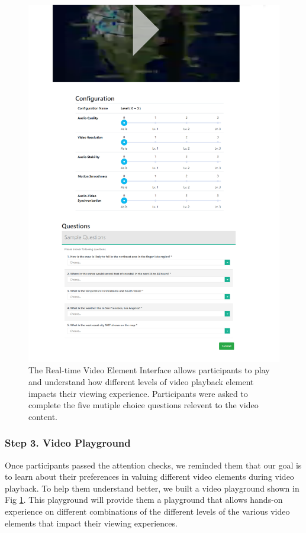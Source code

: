 \begin{figure}[htpb]
    \centering
    \includegraphics[width=\textwidth, keepaspectratio=true]{content/image/exp2_playground.png}
    \caption{
        The Real-time Video Element Interface allows participants to play and understand how different levels of video playback element impacts their viewing experience. Participants were asked to complete the five mutiple choice questions relevent to the video content.
    }
    \label{fig:exp2_playground}
\end{figure}


\subsubsection{Step 3. Video Playground}
Once participants passed the attention checks, we reminded them that our goal is to learn about their preferences in valuing different video elements during video playback. To help them understand better, we built a video playground shown in Fig \ref{fig:exp2_playground}. This playground will provide them a playground that allows hands-on experience on different combinations of the different levels of the various video elements that impact their viewing experiences.

